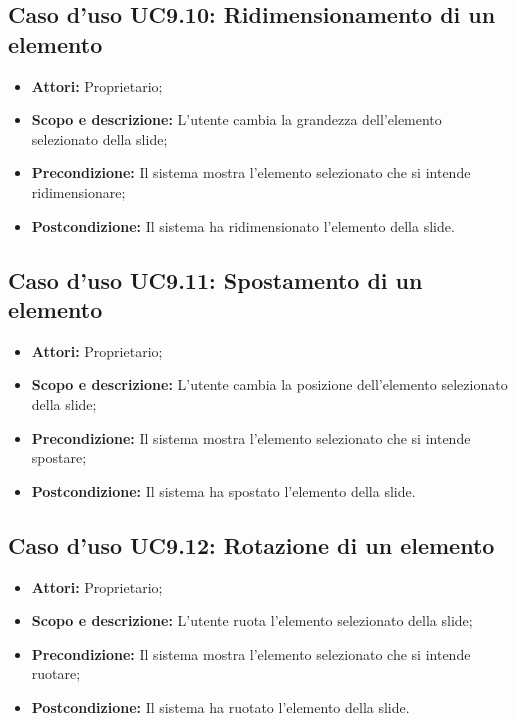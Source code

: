 \subsection{Caso d'uso UC9.10: Ridimensionamento di un elemento}
\begin{itemize}
	\item \textbf{Attori:} Proprietario;
	\item \textbf{Scopo e descrizione:} L'utente cambia la grandezza dell'elemento selezionato della \gls{slide};
	\item \textbf{Precondizione:} Il sistema mostra l'elemento selezionato che si intende ridimensionare;
	\item \textbf{Postcondizione:} Il sistema ha ridimensionato l'elemento della \gls{slide}.
\end{itemize}


\subsection{Caso d'uso UC9.11: Spostamento di un elemento}
\begin{itemize}
	\item \textbf{Attori:} Proprietario;
	\item \textbf{Scopo e descrizione:} L'utente cambia la posizione dell'elemento selezionato della \gls{slide};
	\item \textbf{Precondizione:} Il sistema mostra l'elemento selezionato che si intende spostare;
	\item \textbf{Postcondizione:} Il sistema ha spostato l'elemento della \gls{slide}.
\end{itemize}


\subsection{Caso d'uso UC9.12: Rotazione di un elemento}
\begin{itemize}
	\item \textbf{Attori:} Proprietario;
	\item \textbf{Scopo e descrizione:} L'utente ruota l'elemento selezionato della \gls{slide};
	\item \textbf{Precondizione:} Il sistema mostra l'elemento selezionato che si intende ruotare;
	\item \textbf{Postcondizione:} Il sistema ha ruotato l'elemento della \gls{slide}.
\end{itemize}


